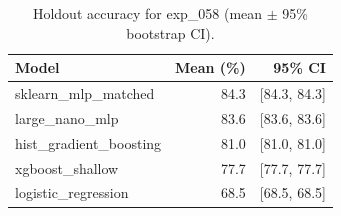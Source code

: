 \begin{table}[ht]
\centering
\caption{Holdout accuracy for exp_058 (mean $\pm$ 95\% bootstrap CI).}
\label{tab:exp_058}
\begin{tabular}{lrr}
\toprule
Model & Mean (\%) & 95\% CI \\
\midrule
sklearn\_mlp\_matched & 84.3 & [84.3, 84.3] \\
large\_nano\_mlp & 83.6 & [83.6, 83.6] \\
hist\_gradient\_boosting & 81.0 & [81.0, 81.0] \\
xgboost\_shallow & 77.7 & [77.7, 77.7] \\
logistic\_regression & 68.5 & [68.5, 68.5] \\
\bottomrule
\end{tabular}
\end{table}
